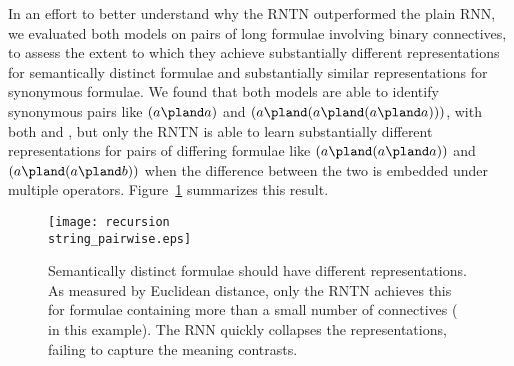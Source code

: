In an effort to better understand why the RNTN outperformed the plain
RNN, we evaluated both models on pairs of long formulae involving
binary connectives, to assess the extent to which they achieve
substantially different representations for semantically distinct
formulae and substantially similar representations for synonymous
formulae. We found that both models are able to identify synonymous
pairs like $(a \pland a)$ and $(a \pland (a \pland (a \pland a)))$,
with both  and , but only the RNTN is able to learn
substantially different representations for pairs of differing formulae like $(a \pland (a \pland a))$
 and $(a \pland (a \pland b))$ when the difference between the two is embedded under multiple operators. 
 Figure~\ref{prop-falloff} summarizes this result.



\begin{figure}[htp]
  \centering
  \texttt{[image: recursion\\string\_pairwise.eps]}
  \caption{Semantically distinct formulae should have different
    representations. As measured by Euclidean distance, only the RNTN
    achieves this for formulae containing more than a small number of
    connectives ( in this example). The RNN quickly collapses the representations,
    failing to capture the meaning contrasts.}
  \label{prop-falloff}
\end{figure}



